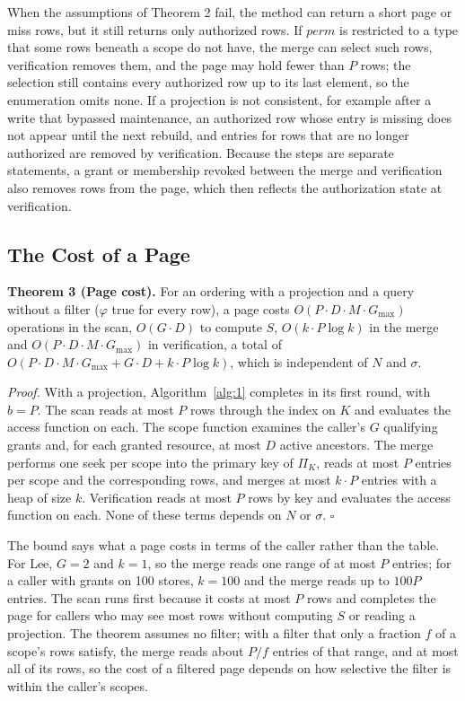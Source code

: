 \documentclass[conference]{IEEEtran}
\begin{document}
When the assumptions of Theorem 2 fail, the method can return a short page or miss rows, but it still returns only authorized rows. If \(\mathit{perm}\) is restricted to a type that some rows beneath a scope do not have, the merge can select such rows, verification removes them, and the page may hold fewer than \(P\) rows; the selection still contains every authorized row up to its last element, so the enumeration omits none. If a projection is not consistent, for example after a write that bypassed maintenance, an authorized row whose entry is missing does not appear until the next rebuild, and entries for rows that are no longer authorized are removed by verification. Because the steps are separate statements, a grant or membership revoked between the merge and verification also removes rows from the page, which then reflects the authorization state at verification.

\subsection{The Cost of a Page}\label{sec-5-3}

\textbf{Theorem 3 (Page cost).} For an ordering with a projection and a query without a filter (\(\varphi\) true for every row), a page costs \(O(P \cdot D \cdot M \cdot G_{\max})\) operations in the scan, \(O(G \cdot D)\) to compute \(S\), \(O(k \cdot P \log k)\) in the merge and \(O(P \cdot D \cdot M \cdot G_{\max})\) in verification, a total of \(O(P \cdot D \cdot M \cdot G_{\max} + G \cdot D + k \cdot P \log k)\), which is independent of \(N\) and \(\sigma\).

\emph{Proof.} With a projection, Algorithm~\ref{alg:1} completes in its first round, with \(b = P\). The scan reads at most \(P\) rows through the index on \(K\) and evaluates the access function on each. The scope function examines the caller's \(G\) qualifying grants and, for each granted resource, at most \(D\) active ancestors. The merge performs one seek per scope into the primary key of \(\Pi_K\), reads at most \(P\) entries per scope and the corresponding rows, and merges at most \(k \cdot P\) entries with a heap of size \(k\). Verification reads at most \(P\) rows by key and evaluates the access function on each. None of these terms depends on \(N\) or \(\sigma\). \(\square\)

The bound says what a page costs in terms of the caller rather than the table. For Lee, \(G = 2\) and \(k = 1\), so the merge reads one range of at most \(P\) entries; for a caller with grants on 100 stores, \(k = 100\) and the merge reads up to \(100P\) entries. The scan runs first because it costs at most \(P\) rows and completes the page for callers who may see most rows without computing \(S\) or reading a projection. The theorem assumes no filter; with a filter that only a fraction \(f\) of a scope's rows satisfy, the merge reads about \(P/f\) entries of that range, and at most all of its rows, so the cost of a filtered page depends on how selective the filter is within the caller's scopes.
\end{document}

